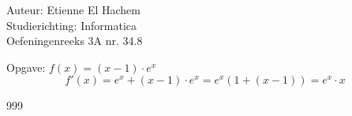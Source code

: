 \documentclass[a4paper]{article}
\begin{document}
  
\noindent \large Auteur: Etienne El Hachem \\
\noindent \large Studierichting: Informatica\\
\noindent \large Oefeningenreeks 3A nr. 34.8\\

\medskip

\normalsize

Opgave: $f(x) = (x-1)\cdot e^x$ \\

$$f'(x) = e^x+(x-1)\cdot e^x = e^x(1+(x-1)) = e^x\cdot x$$

\begin{thebibliography}{999}
\end{thebibliography}
\end{document}
